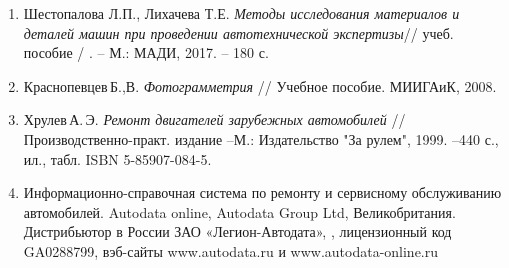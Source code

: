 \begin{enumerate}
%
%
% 
%
%
\item 
Шестопалова Л.П., Лихачева Т.Е. \emph{Методы исследования материалов и деталей машин при проведении автотехнической экспертизы}// учеб. пособие /
. – М.: МАДИ, 2017. – 180 с.
%
%
%
%
\item 
Краснопевцев\,Б.,В. \emph{Фотограмметрия} // Учебное пособие. МИИГАиК, 2008.
%
\item 
Хрулев\,А.\,Э. \emph{Ремонт двигателей зарубежных автомобилей} // Производственно-практ. издание --М.: Издательство "За рулем", 1999. --440 с., ил., табл.  ISBN 5-85907-084-5.
%
%
%
\item
Информационно-справочная система по ремонту и сервисному обслуживанию автомобилей. Autodata online,  Autodata Group Ltd, Великобритания. Дистрибьютор в России ЗАО «Легион-Автодата», , лицензионный код GA0288799, вэб-сайты www.autodata.ru и www.autodata-online.ru


\end{enumerate}
